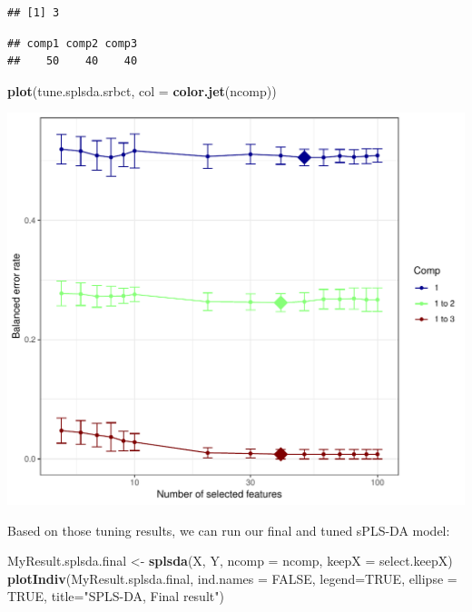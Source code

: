 \documentclass[]{book}
\newenvironment{Shaded}{\begin{snugshade}}{\end{snugshade}}
\newcommand{\CommentTok}[1]{\textcolor[rgb]{0.56,0.35,0.01}{\textit{#1}}}
\newcommand{\DataTypeTok}[1]{\textcolor[rgb]{0.13,0.29,0.53}{#1}}
\newcommand{\DecValTok}[1]{\textcolor[rgb]{0.00,0.00,0.81}{#1}}
\newcommand{\KeywordTok}[1]{\textcolor[rgb]{0.13,0.29,0.53}{\textbf{#1}}}
\newcommand{\NormalTok}[1]{#1}
\newcommand{\OperatorTok}[1]{\textcolor[rgb]{0.81,0.36,0.00}{\textbf{#1}}}
\newcommand{\OtherTok}[1]{\textcolor[rgb]{0.56,0.35,0.01}{#1}}
\newcommand{\StringTok}[1]{\textcolor[rgb]{0.31,0.60,0.02}{#1}}
\begin{document}
\begin{verbatim}
## [1] 3
\end{verbatim}

\begin{Shaded}
\end{Shaded}

\begin{verbatim}
## comp1 comp2 comp3 
##    50    40    40
\end{verbatim}

\begin{Shaded}
\begin{Highlighting}[]
\KeywordTok{plot}\NormalTok{(tune.splsda.srbct, }\DataTypeTok{col =} \KeywordTok{color.jet}\NormalTok{(ncomp))}
\end{Highlighting}
\end{Shaded}

\begin{center}\includegraphics[width=0.5\linewidth]{Figures/04-tune-values-1} \end{center}

Based on those tuning results, we can run our final and tuned sPLS-DA model:

\begin{Shaded}
\begin{Highlighting}[]
\NormalTok{MyResult.splsda.final <-}\StringTok{ }\KeywordTok{splsda}\NormalTok{(X, Y, }\DataTypeTok{ncomp =}\NormalTok{ ncomp, }\DataTypeTok{keepX =}\NormalTok{ select.keepX)}
\KeywordTok{plotIndiv}\NormalTok{(MyResult.splsda.final, }\DataTypeTok{ind.names =} \OtherTok{FALSE}\NormalTok{, }\DataTypeTok{legend=}\OtherTok{TRUE}\NormalTok{,}
          \DataTypeTok{ellipse =} \OtherTok{TRUE}\NormalTok{, }\DataTypeTok{title=}\StringTok{"SPLS-DA, Final result"}\NormalTok{)}
\end{Highlighting}
\end{Shaded}
\end{document}

